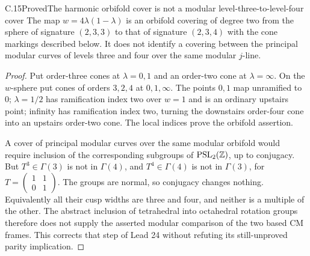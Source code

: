 \begin{statement}{C.15}{Proved}{The harmonic orbifold cover is not a modular level-three-to-level-four cover}
The map $w=4\lambda(1-\lambda)$ is an orbifold covering of degree
two from the sphere of signature $(2,3,3)$ to that of signature
$(2,3,4)$ with the cone markings described below. It does not
identify a covering between the principal modular curves of levels
three and four over the same modular $j$-line.
\end{statement}
\begin{proof}
Put order-three cones at $\lambda=0,1$ and an order-two cone at
$\lambda=\infty$. On the $w$-sphere put cones of orders $3,2,4$
at $0,1,\infty$. The points $0,1$ map unramified to $0$;
$\lambda=1/2$ has ramification index two over $w=1$ and is an
ordinary upstairs point; infinity has ramification index two,
turning the downstairs order-four cone into an upstairs order-two
cone. The local indices prove the orbifold assertion.

A cover of principal modular curves over the same modular orbifold
would require inclusion of the corresponding subgroups of
$\operatorname{PSL}_2(\mathbb Z)$, up to conjugacy. But $T^3\in\Gamma(3)$
is not in $\Gamma(4)$, and $T^4\in\Gamma(4)$ is not in
$\Gamma(3)$, for $T=\left(\begin{smallmatrix}1&1\\0&1\end{smallmatrix}\right)$.
The groups are normal, so conjugacy changes nothing. Equivalently
all their cusp widths are three and four, and neither is a multiple
of the other. The abstract inclusion of tetrahedral into octahedral
rotation groups therefore does not supply the asserted modular
comparison of the two based CM frames. This corrects that step
of Lead 24 without refuting its still-unproved parity implication.
\end{proof}

